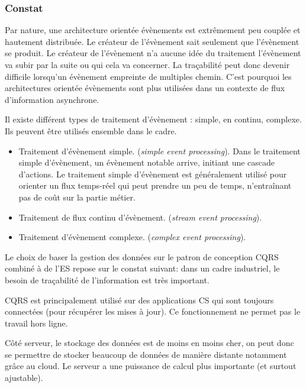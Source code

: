 \subsubsection{Constat}

Par nature, une architecture orientée évènements est extrêmement peu couplée et 
hautement distribuée. Le créateur de l'évènement sait seulement que l'évènement 
se produit. 
Le créateur de l'évènement n'a aucune idée du traitement l'évènement va subir par 
la suite ou qui cela va concerner. La traçabilité peut donc devenir difficile lorsqu'un 
évènement empreinte de multiples chemin. C'est pourquoi les architectures 
orientée évènements sont plus utilisées dans un contexte de flux d'information 
asynchrone. 

Il existe différent types de traitement d'évènement : simple, en continu, complexe. 
Ils peuvent être utilisés ensemble dans le cadre.
\begin{itemize}
\item Traitement d'évènement simple. (\textit{simple event processing}). 
Dans le traitement simple d'évènement, un évènement notable arrive, initiant une 
cascade d'actions. Le traitement simple d'évènement est généralement utilisé pour 
orienter un flux temps-réel qui peut prendre un peu de temps, n'entraînant pas de 
coût sur la partie métier.
\item Traitement de flux continu d'évènement. (\textit{stream event 
processing}). 
\item Traitement d'évènement complexe. (\textit{complex event 
processing}). 

\end{itemize}

Le choix de baser la gestion des données sur le patron de conception \gls{CQRS} 
combiné à de l'\gls{ES} repose sur le constat suivant: dans un cadre industriel, le 
besoin de traçabilité de l'information est très important. 

\gls{CQRS} est principalement utilisé sur des applications \gls{CS} qui sont 
toujours connectées (pour récupérer les mises à jour). Ce fonctionnement ne 
permet pas le travail hors ligne.

Côté serveur, le stockage des données est de moins en moins cher, on peut donc 
se permettre de stocker beaucoup de données de manière distante notamment 
grâce au \gls{cloud}. Le serveur a une puissance de calcul 
plus importante (et surtout ajustable).

